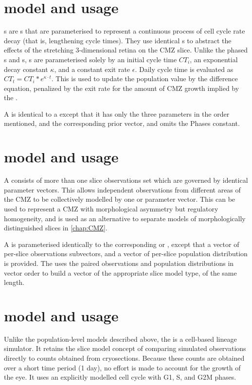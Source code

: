 \section{\protect{} model and usage}
\label{sec:decaymodel}
s are s that are parameterised to represent a continuous process of cell cycle rate decay (that is, lengthening cycle times). They use identical s to abstract the effects of the stretching 3-dimensional retina on the CMZ slice. Unlike the phased s and s, s are parameterised solely by an initial cycle time $CT_{i}$, an exponential decay constant $\kappa$, and a constant exit rate $\epsilon$. Daily cycle time is evaluated as $CT_{t}=CT_i*e^{\kappa \cdot t}$. This is used to update the population value by the  difference equation, penalized by the exit rate for the amount of CMZ growth implied by the .

A  is identical to a  except that it has only the three parameters in the order mentioned, and the corresponding prior vector, and omits the Phases constant.

\section{\protect{} model and usage}
A  consists of more than one slice observations set which are governed by identical parameter vectors. This allows independent observations from different areas of the CMZ to be collectively modelled by one  or  parameter vector. This can be used to represent a CMZ with morphological asymmetry but regulatory homogeneity, and is used as an alternative to separate models of morphologically distinguished slices in \autoref{chap:CMZ}. 

A  is parameterised identically to the corresponding  or , except that a vector of per-slice observations subvectors, and a vector of per-slice population distribution is provided. The  uses the paired observations and population distributions in vector order to build a vector of the appropriate slice model type, of the same length.

\section{\protect{} model and usage}
\label{sec:thymidinemodel}
Unlike the population-level models described above, the  is a cell-based lineage simulator. It retains the slice model concept of comparing simulated observations directly to counts obtained from cryosections. Because these counts are obtained over a short time period (1 day), no effort is made to account for the growth of the eye. It uses an explicitly modelled cell cycle with G1, S, and G2\/M phases.

